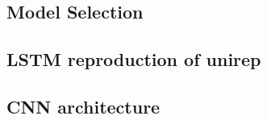 \subsection{Model Selection}


\subsection{LSTM reproduction of unirep}


\subsection{CNN architecture}
